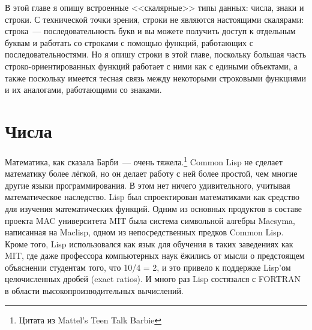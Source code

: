 В этой главе я опишу встроенные <<скалярные>> типы данных: числа, знаки и строки.  С
технической точки зрения, строки не являются настоящими скалярами: строка~---
последовательность букв и вы можете получить доступ к отдельным буквам и работать со
строками с помощью функций, работающих с последовательностями.  Но я опишу строки в этой
главе, поскольку большая часть строко-ориентированных функций работает с ними как с
едиными объектами, а также поскольку имеется тесная связь между некоторыми строковыми
функциями и их аналогами, работающими со знаками.

\section{Числа}

Математика, как сказала Барби~--- очень тяжела.\footnote{Цитата из Mattel's Teen Talk
  Barbie} Common Lisp не сделает математику более лёгкой, но он делает работу с ней более
простой, чем многие другие языки программирования.  В этом нет ничего удивительного,
учитывая математическое наследство.  Lisp был спроектирован математиками как средство для
изучения математических функций.  Одним из основных продуктов в составе проекта MAC
университета MIT была система символьной алгебры Macsyma, написанная на Maclisp, одном из
непосредственных предков Common Lisp.  Кроме того, Lisp использовался как язык для
обучения в таких заведениях как MIT, где даже профессора компьютерных наук ёжились от
мысли о предстоящем объяснении студентам того, что 10/4 = 2, и это привело к поддержке
Lisp'ом целочисленных дробей (exact ratios).  И много раз Lisp состязался с FORTRAN в
области высокопроизводительных вычислений.

